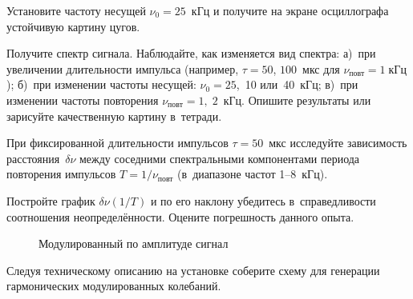 \begin{lab:task}
\item Установите частоту несущей $\nu_0=25$~кГц и получите на экране осциллографа
устойчивую картину цугов.

\item Получите спектр сигнала. Наблюдайте, как изменяется вид спектра:
а)~при увеличении длительности импульса (например, $\tau=50$, $100$~мкс
для $\nu_\text{повт}=1\;кГц$); б)~при изменении частоты несущей:
$\nu_0=25$,~10 или~40~кГц; в)~при изменении частоты повторения
$\nu_{повт}=1,\;2$~кГц. Опишите результаты или зарисуйте качественную
картину в~тетради.

\item При фиксированной длительности импульсов $\tau=50$~мкс исследуйте
зависимость расстояния~$\delta \nu$ между соседними спектральными компонентами
периода повторения импульсов $T=1/\nu_\text{повт}$
(в~диапазоне частот 1--8~кГц).

\item Постройте график $\delta \nu(1/T)$ и по его наклону
убедитесь в~справедливости соотношения неопределённости.
Оцените погрешность данного опыта.




\begin{figure}[h!]
    \centering
{}
    \caption{Модулированный по амплитуде сигнал}
\end{figure}

\item Следуя техническому описанию на установке соберите схему для
генерации гармонических модулированных колебаний.


\end{lab:task}
